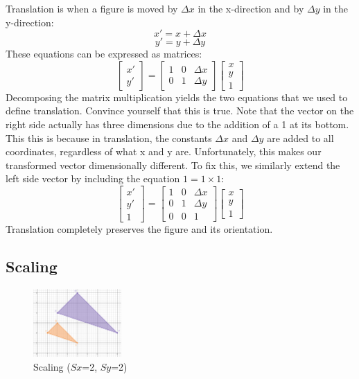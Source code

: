 \documentclass{article}
\begin{document}
Translation is when a figure is moved by $\Delta x$ in the x-direction and by $\Delta y$ in the y-direction:
\[x' = x + \Delta x\]
\[y' = y + \Delta y\]
\noindent
These equations can be expressed as matrices:
\[
\begin{bmatrix}
x' \\
y'
\end{bmatrix}
=
\begin{bmatrix}
1 & 0 & \Delta x \\
0 & 1 & \Delta y
\end{bmatrix}
\begin{bmatrix}
x \\
y \\
1
\end{bmatrix}
\]
\noindent
Decomposing the matrix multiplication yields the two equations that we used to define translation. Convince yourself that this is true. Note that the vector on the right side actually has three dimensions due to the addition of a 1 at its bottom. This this is because in translation, the constants $\Delta x$ and $\Delta y$ are added to all coordinates, regardless of what x and y are. Unfortunately, this makes our transformed vector dimensionally different. To fix this, we similarly extend the left side vector by including the equation $1=1\times1$:
\[
\begin{bmatrix}
x' \\
y' \\
1
\end{bmatrix}
=
\begin{bmatrix}
1 & 0 & \Delta x \\
0 & 1 & \Delta y \\
0 & 0 & 1
\end{bmatrix}
\begin{bmatrix}
x \\
y \\
1
\end{bmatrix}
\]
\noindent
Translation completely preserves the figure and its orientation.

\subsection{Scaling}
\begin{figure}
  \begin{center}
    \vspace{-75pt}
    \includegraphics[width=0.3\textwidth]{2d_scaling.png}
    \vspace{-17.5pt}
  \end{center}
  \caption{Scaling ($Sx$=2, $Sy$=2)}
\end{figure}
\end{document}
